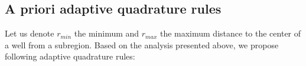 \documentclass{elsarticle}
\newcommand{\noteJB}[1]{{\color{Blue} \textbf{JB: } \textit{#1}}}
\newcommand{\notePE}[1]{{\color{Orange} \textbf{PE: } \textit{#1}}}
\begin{document}
\subsection{A priori adaptive quadrature rules}
Let us denote $r_{min}$ the minimum and $r_{max}$ the maximum distance to the center of a well from a subregion. 
Based on the analysis presented above, we propose following adaptive quadrature rules:



\end{document}
